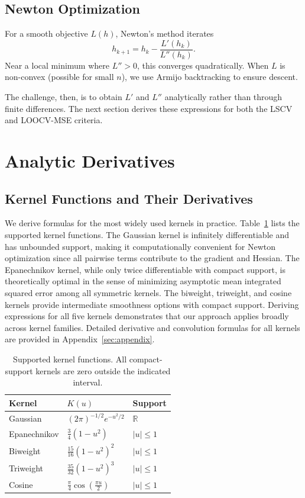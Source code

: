 \documentclass[11pt]{article}
\theoremstyle{definition}
\theoremstyle{remark}
\begin{document}
\subsection{Newton Optimization}

For a smooth objective $L(h)$, Newton's method iterates
\begin{equation}
    h_{k+1} = h_k - \frac{L'(h_k)}{L''(h_k)}.
\end{equation}
Near a local minimum where $L'' > 0$, this converges quadratically.
When $L$ is non-convex (possible for small $n$), we use Armijo backtracking to ensure descent.

The challenge, then, is to obtain $L'$ and $L''$ analytically rather than through finite differences.
The next section derives these expressions for both the LSCV and LOOCV-MSE criteria.

\section{Analytic Derivatives}
\label{sec:derivatives}

\subsection{Kernel Functions and Their Derivatives}

We derive formulas for the most widely used kernels in practice.
Table~\ref{tab:kernels} lists the supported kernel functions.
The Gaussian kernel is infinitely differentiable and has unbounded support, making it computationally convenient for Newton optimization since all pairwise terms contribute to the gradient and Hessian.
The Epanechnikov kernel, while only twice differentiable with compact support, is theoretically optimal in the sense of minimizing asymptotic mean integrated squared error among all symmetric kernels.
The biweight, triweight, and cosine kernels provide intermediate smoothness options with compact support.
Deriving expressions for all five kernels demonstrates that our approach applies broadly across kernel families.
Detailed derivative and convolution formulas for all kernels are provided in Appendix~\ref{sec:appendix}.

\begin{table}[h]
\centering
\caption{Supported kernel functions. All compact-support kernels are zero outside the indicated interval.}
\label{tab:kernels}
\begin{tabular}{lll}
\toprule
Kernel & $K(u)$ & Support \\
\midrule
Gaussian & $(2\pi)^{-1/2} e^{-u^2/2}$ & $\mathbb{R}$ \\
Epanechnikov & $\frac{3}{4}(1-u^2)$ & $|u| \leq 1$ \\
Biweight & $\frac{15}{16}(1-u^2)^2$ & $|u| \leq 1$ \\
Triweight & $\frac{35}{32}(1-u^2)^3$ & $|u| \leq 1$ \\
Cosine & $\frac{\pi}{4}\cos\left(\frac{\pi u}{2}\right)$ & $|u| \leq 1$ \\
\bottomrule
\end{tabular}
\end{table}
\end{document}
